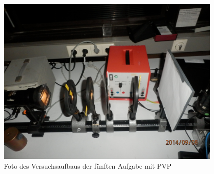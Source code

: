 \documentclass[12pt]{scrartcl}
\begin{document}
\begin{figure}[H]
\centering
    \includegraphics[scale = 0.1]{aufgabe_5_1.JPG}
  	\caption[Foto des Versuchsaufbaus der fünften Aufgabe mit PVP]{Foto des Versuchsaufbaus der fünften Aufgabe mit PVP}
  \label{fig:aufgabe_5_1}
\end{figure}
\end{document}
